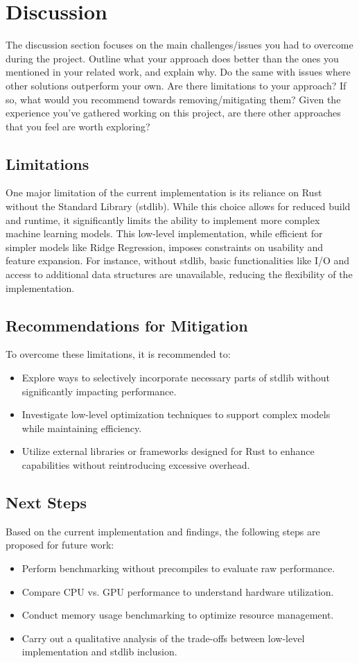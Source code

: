 \documentclass{scrartcl}
\begin{document}
\section{Discussion}
The discussion section focuses on the main challenges/issues you had to overcome during the project. Outline what your approach does better than the ones you mentioned in your related work, and explain why. Do the same with issues where other solutions  outperform your own. Are there limitations to your approach? If so, what would you recommend towards removing/mitigating them? Given the experience you've gathered working on this project, are there other approaches that you feel are worth exploring?

\subsection{Limitations}
One major limitation of the current implementation is its reliance on Rust without the Standard Library (stdlib). While this choice allows for reduced build and runtime, it significantly limits the ability to implement more complex machine learning models. This low-level implementation, while efficient for simpler models like Ridge Regression, imposes constraints on usability and feature expansion. For instance, without stdlib, basic functionalities like I/O and access to additional data structures are unavailable, reducing the flexibility of the implementation.

\subsection{Recommendations for Mitigation}
To overcome these limitations, it is recommended to:
\begin{itemize}
	\item Explore ways to selectively incorporate necessary parts of stdlib without significantly impacting performance.
	\item Investigate low-level optimization techniques to support complex models while maintaining efficiency.
	\item Utilize external libraries or frameworks designed for Rust to enhance capabilities without reintroducing excessive overhead.
\end{itemize}

\subsection{Next Steps}
Based on the current implementation and findings, the following steps are proposed for future work:
\begin{itemize}
	\item Perform benchmarking without precompiles to evaluate raw performance.
	\item Compare CPU vs. GPU performance to understand hardware utilization.
	\item Conduct memory usage benchmarking to optimize resource management.
	\item Carry out a qualitative analysis of the trade-offs between low-level implementation and stdlib inclusion.
\end{itemize}
\end{document}
